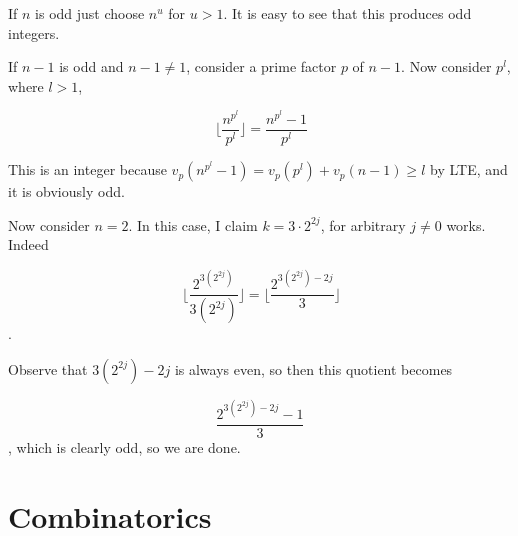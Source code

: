 \documentclass{subfile}
\begin{document}
	\begin{solution} If $n$ is odd just choose $n^u$ for $u > 1$. It is easy to see that this produces odd integers.
		
		If $n-1$ is odd and $n-1 \neq 1$, consider a prime factor $p$ of $n-1$. Now consider $p^l$, where $l > 1$,
		
		\[\ \lfloor\frac{n^{p^l}}{p^l}\rfloor = \frac{n^{p^l}-1}{p^l} \]
		
		This is an integer because $v_p(n^{p^l}-1) = v_p(p^l) + v_p(n-1) \ge l$ by LTE, and it is obviously odd.
		
		Now consider $n = 2$. In this case, I claim $k = 3 \cdot 2^{2j}$, for arbitrary $j \neq 0$ works. Indeed
		
		\[\ \lfloor\frac{2^{3(2^{2j})}}{3(2^{2j})} \rfloor = \lfloor \frac{2^{3(2^{2j})-2j}}{3} \rfloor \].
		
		Observe that $3(2^{2j})-2j$ is always even, so then this quotient becomes
		
		\[ \frac{2^{3(2^{2j})-2j}-1}{3} \], which is clearly odd, so we are done.
	\end{solution}
	

	
	
	\newpage
	
	\section{Combinatorics}
	
\end{document}
